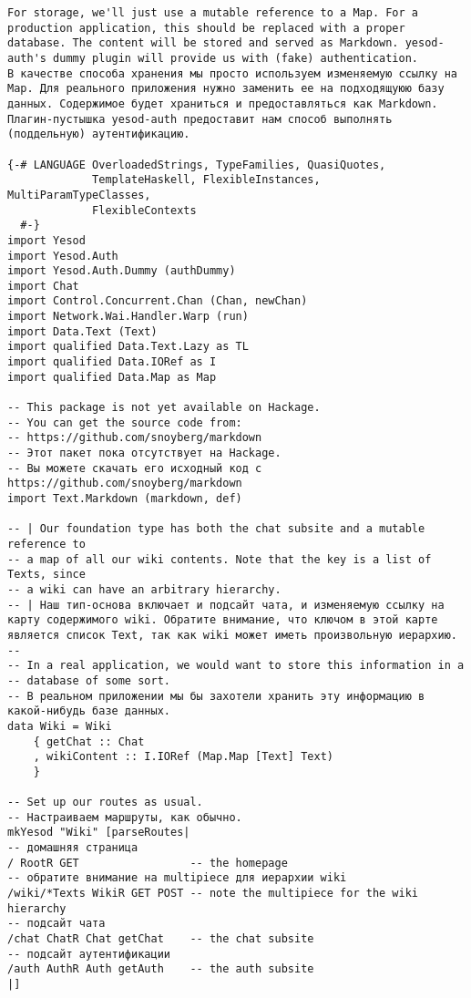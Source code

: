 \begin{lstlisting}
For storage, we'll just use a mutable reference to a Map. For a production application, this should be replaced with a proper database. The content will be stored and served as Markdown. yesod-auth's dummy plugin will provide us with (fake) authentication.
В качестве способа хранения мы просто используем изменяемую ссылку на Map. Для реального приложения нужно заменить ее на подходящуюю базу данных. Содержимое будет храниться и предоставляться как Markdown. Плагин-пустышка yesod-auth предоставит нам способ выполнять (поддельную) аутентификацию.

{-# LANGUAGE OverloadedStrings, TypeFamilies, QuasiQuotes,
             TemplateHaskell, FlexibleInstances, MultiParamTypeClasses,
             FlexibleContexts
  #-}
import Yesod
import Yesod.Auth
import Yesod.Auth.Dummy (authDummy)
import Chat
import Control.Concurrent.Chan (Chan, newChan)
import Network.Wai.Handler.Warp (run)
import Data.Text (Text)
import qualified Data.Text.Lazy as TL
import qualified Data.IORef as I
import qualified Data.Map as Map

-- This package is not yet available on Hackage.
-- You can get the source code from:
-- https://github.com/snoyberg/markdown
-- Этот пакет пока отсутствует на Hackage.
-- Вы можете скачать его исходный код с https://github.com/snoyberg/markdown
import Text.Markdown (markdown, def)

-- | Our foundation type has both the chat subsite and a mutable reference to
-- a map of all our wiki contents. Note that the key is a list of Texts, since
-- a wiki can have an arbitrary hierarchy.
-- | Наш тип-основа включает и подсайт чата, и изменяемую ссылку на карту содержимого wiki. Обратите внимание, что ключом в этой карте является список Text, так как wiki может иметь произвольную иерархию.
--
-- In a real application, we would want to store this information in a
-- database of some sort.
-- В реальном приложении мы бы захотели хранить эту информацию в какой-нибудь базе данных.
data Wiki = Wiki
    { getChat :: Chat
    , wikiContent :: I.IORef (Map.Map [Text] Text)
    }

-- Set up our routes as usual.
-- Настраиваем маршруты, как обычно.
mkYesod "Wiki" [parseRoutes|
-- домашняя страница
/ RootR GET                 -- the homepage
-- обратите внимание на multipiece для иерархии wiki
/wiki/*Texts WikiR GET POST -- note the multipiece for the wiki hierarchy
-- подсайт чата
/chat ChatR Chat getChat    -- the chat subsite
-- подсайт аутентификации
/auth AuthR Auth getAuth    -- the auth subsite
|]


\end{lstlisting}
